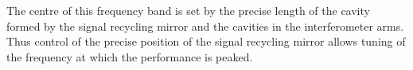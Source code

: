 \documentclass{article}
\begin{document}

The centre of this frequency band is set by the precise length of the
cavity formed by the signal recycling mirror and the cavities in the
interferometer arms. Thus control of the precise position of the
signal recycling mirror allows tuning of the frequency at which the
performance is peaked.
\end{document}
